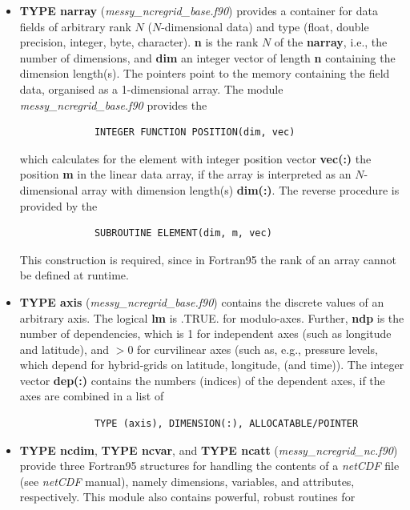 \documentclass[12pt, a4paper]{article}
\begin{document}
\begin{itemize}
%
 \item {\bf TYPE narray} ({\it messy\_ncregrid\_base.f90}) provides
       a container for data fields of arbitrary rank $N$
       ($N$-dimensional data) and type
       (float, double precision, integer, byte, character).
       {\bf n} is the rank $N$ of the {\bf narray},
       i.e., the number of dimensions, and
       {\bf dim} an integer vector of length {\bf n} containing the dimension
       length(s). The pointers point to the memory containing the field data,
       organised as a 1-dimensional array.
       The module {\it messy\_ncregrid\_base.f90} provides the 
       \begin{verbatim}
             INTEGER FUNCTION POSITION(dim, vec)
       \end{verbatim}
       which calculates for the element with integer position vector
       {\bf vec(:)} the position {\bf m} in the linear data array,
       if the array is interpreted as an $N$-dimensional array with
       dimension length(s) {\bf dim(:)}.
       The reverse procedure is provided by the
       \begin{verbatim}
             SUBROUTINE ELEMENT(dim, m, vec)
       \end{verbatim}
       This construction is required, since in Fortran95 the rank of an array
       cannot be defined at runtime.
%
 \item {\bf TYPE axis} ({\it messy\_ncregrid\_base.f90}) contains the discrete
       values of an arbitrary axis.
       The logical {\bf lm} is .TRUE. for modulo-axes. Further, 
       {\bf ndp} is the number of dependencies,
       which is 1 for independent axes (such as longitude and latitude),
       and $>0$ for curvilinear axes (such as, e.g., pressure levels, which
       depend for hybrid-grids on latitude, longitude, (and time)).
       The integer vector {\bf dep(:)} contains the numbers (indices)
       of the dependent axes, if the axes are combined in a list of
       \begin{verbatim}
             TYPE (axis), DIMENSION(:), ALLOCATABLE/POINTER
       \end{verbatim}
%
\item {\bf TYPE ncdim}, {\bf TYPE ncvar}, and {\bf TYPE ncatt}
      ({\it messy\_ncregrid\_nc.f90}) provide three Fortran95 structures
      for handling the contents of a {\it netCDF} file
      (see {\it netCDF} manual), namely
      dimensions, variables, and attributes, respectively.
      This module also contains powerful, robust routines for

\end{itemize}
\end{document}
